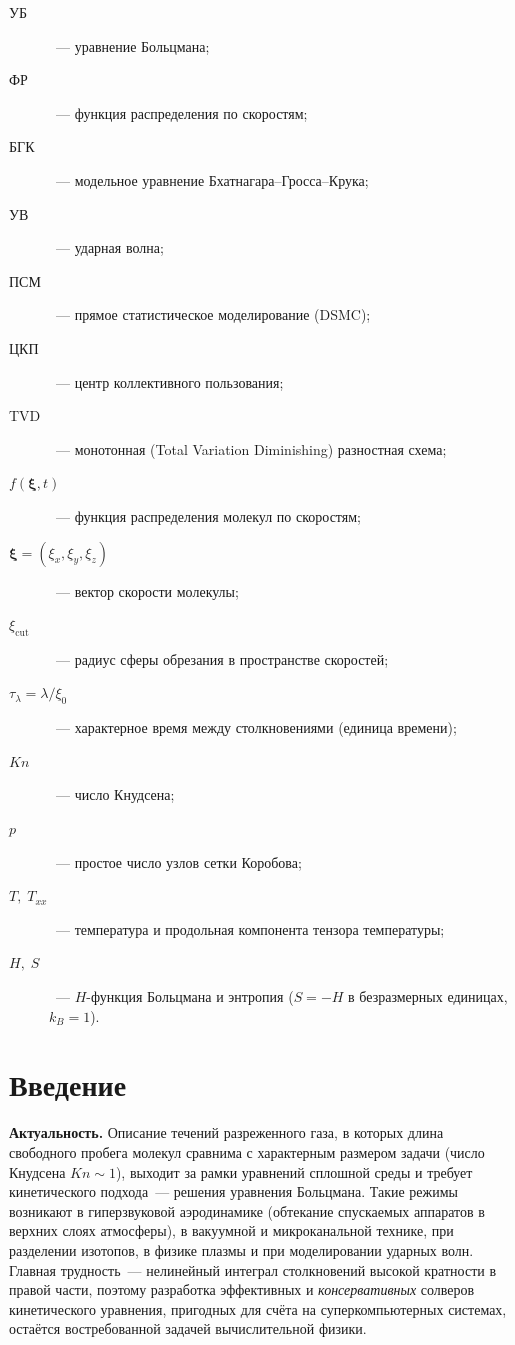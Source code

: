 \documentclass[14pt,a4paper]{extreport}
\numberwithin{equation}{chapter}
\numberwithin{figure}{chapter}
\numberwithin{table}{chapter}
\newcommand{\xv}{\boldsymbol{\xi}}
\begin{document}
\begin{description}
  \item[УБ]~--- уравнение Больцмана;
  \item[ФР]~--- функция распределения по скоростям;
  \item[БГК]~--- модельное уравнение Бхатнагара--Гросса--Крука;
  \item[УВ]~--- ударная волна;
  \item[ПСМ]~--- прямое статистическое моделирование (DSMC);
  \item[ЦКП]~--- центр коллективного пользования;
  \item[TVD]~--- монотонная (Total Variation Diminishing) разностная схема;
  \item[$f(\xv,t)$]~--- функция распределения молекул по скоростям;
  \item[$\xv=(\xi_x,\xi_y,\xi_z)$]~--- вектор скорости молекулы;
  \item[$\xi_{\mathrm{cut}}$]~--- радиус сферы обрезания в пространстве скоростей;
  \item[$\tau_\lambda=\lambda/\xi_0$]~--- характерное время между столкновениями (единица времени);
  \item[$Kn$]~--- число Кнудсена;
  \item[$p$]~--- простое число узлов сетки Коробова;
  \item[$T,\;T_{xx}$]~--- температура и продольная компонента тензора температуры;
  \item[$H,\;S$]~--- $H$-функция Больцмана и энтропия ($S=-H$ в безразмерных единицах, $k_B=1$).
\end{description}


\chapter*{Введение}

\textbf{Актуальность.}
Описание течений разреженного газа, в которых длина свободного пробега молекул сравнима с характерным размером задачи
(число Кнудсена $Kn\sim 1$), выходит за рамки уравнений сплошной среды и требует кинетического подхода~--- решения
уравнения Больцмана.
Такие режимы возникают в гиперзвуковой аэродинамике (обтекание спускаемых аппаратов в верхних слоях атмосферы), в
вакуумной и микроканальной технике, при разделении изотопов, в физике плазмы и при моделировании ударных волн.
Главная трудность~--- нелинейный интеграл столкновений высокой кратности в правой части, поэтому разработка эффективных
и \emph{консервативных} солверов кинетического уравнения, пригодных для счёта на суперкомпьютерных системах, остаётся
востребованной задачей вычислительной физики.
\end{document}
